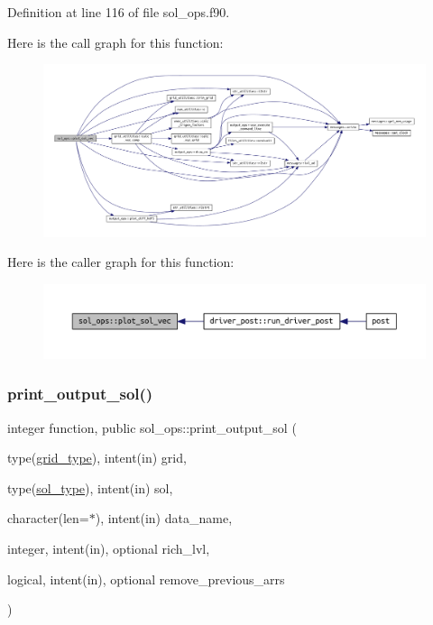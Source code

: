 Definition at line 116 of file sol\+\_\+ops.\+f90.

Here is the call graph for this function\+:\nopagebreak
\begin{figure}[H]
\begin{center}
\leavevmode
\includegraphics[width=350pt]{namespacesol__ops_a13b3cf2fb6437a3c93256368fa91c267_cgraph}
\end{center}
\end{figure}
Here is the caller graph for this function\+:\nopagebreak
\begin{figure}[H]
\begin{center}
\leavevmode
\includegraphics[width=350pt]{namespacesol__ops_a13b3cf2fb6437a3c93256368fa91c267_icgraph}
\end{center}
\end{figure}
\mbox{\label{namespacesol__ops_a06eb95d55da45ff2a1f830a380e0cf80}} 
\subsubsection{\texorpdfstring{print\+\_\+output\+\_\+sol()}{print\_output\_sol()}}
{\footnotesize\ttfamily integer function, public sol\+\_\+ops\+::print\+\_\+output\+\_\+sol (\begin{DoxyParamCaption}\item[{type(\hyperlink{structgrid__vars_1_1grid__type}{grid\+\_\+type}), intent(in)}]{grid,  }\item[{type(\hyperlink{structsol__vars_1_1sol__type}{sol\+\_\+type}), intent(in)}]{sol,  }\item[{character(len=$\ast$), intent(in)}]{data\+\_\+name,  }\item[{integer, intent(in), optional}]{rich\+\_\+lvl,  }\item[{logical, intent(in), optional}]{remove\+\_\+previous\+\_\+arrs }\end{DoxyParamCaption})}



